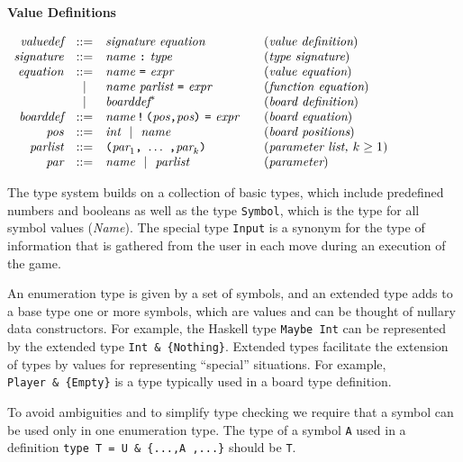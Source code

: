 \documentclass[11pt]{article}
\makeatletter
\newcommand{\prodName}[1]{&(\emph{#1})\\}
\newcommand{\nt}[1]{\textit{#1}}
\newcommand{\prog}[1]{\texttt{#1}}
\newcommand{\ORil}{\ \ |\ \ }
\newcommand{\IS}{&::=&}
\newcommand{\OR}{&|&}
\newcommand{\syntax}[2]{
  \needspace{3\baselineskip}
  \bigskip\par\noindent\textbf{#1}\par\smallskip%
  $\begin{array}{rcl@{\qquad}l}#2\end{array}$%
  \par\bigskip\noindent\ignorespaces
}
\newcommand{\lp}{\prog{(}}
\newcommand{\rp}{\prog{)}}
\newcommand{\paren}[1]{\lp#1\rp}
\newcommand{\pair}[2]{\paren{#1\prog{,}#2}}
\makeatother
\begin{document}
\syntax{Value Definitions}{
\nt{valuedef}  \IS \nt{signature}\ \nt{equation}   \prodName{value definition}
\nt{signature} \IS \nt{name}\ \prog{:}\ \nt{type}  \prodName{type signature}
\nt{equation}  \IS \nt{name}\ \prog{=}\ \nt{expr}  \prodName{value equation}
               \OR \nt{name}\ \nt{parlist}\ \prog{=}\ \nt{expr}
                   \prodName{function equation}
               \OR \nt{boarddef}^*                  \prodName{board definition}
\nt{boarddef}  \IS \nt{name}\,\prog{!}\,\pair{\nt{pos}}{\nt{pos}}\ \prog{=}\ \nt{expr}
                   \prodName{board equation}
\nt{pos}       \IS \nt{int} \ORil \nt{name}      \prodName{board positions}
\nt{parlist}   \IS \paren{\nt{par}_1\prog{,}\ \ldots\ \prog{,}\nt{par}_k}
                   \prodName{parameter list, $k\geq 1$}
\nt{par}       \IS \nt{name} \ORil \nt{parlist}   \prodName{parameter}
}
%
The type system builds on a collection of basic types, which include
predefined numbers and booleans as well as the type \prog{Symbol}, which is the
type for all symbol values (\nt{Name}).
%
%
The special type \prog{Input} is a synonym for the type of information that is
gathered from the user in each move during an execution of the game.
%

An enumeration type is given by a set of symbols, and an  extended type adds to
a base type one or more symbols, which are values and can be thought of nullary
data constructors. For example, the Haskell type \prog{Maybe Int} can be
represented by the extended type \prog{Int~\&~\{Nothing\}}. Extended types
facilitate the extension of types by values for representing ``special''
situations. For example, \prog{Player~\&~\{Empty\}} is a type typically used in
a board type definition.

To avoid ambiguities and to simplify type checking we require that a symbol can
be used only in one enumeration type. The type of a symbol \prog{A} used in a
definition \prog{type~T~=~U~\&~\{...,A~,...\}} should be \prog{T}.
\end{document}
